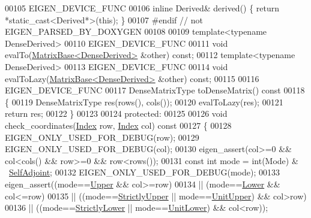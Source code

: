 \begin{DoxyCode}
00105     EIGEN\_DEVICE\_FUNC
00106     \textcolor{keyword}{inline} Derived& derived() \{ \textcolor{keywordflow}{return} *\textcolor{keyword}{static\_cast<}Derived*\textcolor{keyword}{>}(\textcolor{keyword}{this}); \}
00107 \textcolor{preprocessor}{    #endif // not EIGEN\_PARSED\_BY\_DOXYGEN}
00108 
00109     \textcolor{keyword}{template}<\textcolor{keyword}{typename} DenseDerived>
00110     EIGEN\_DEVICE\_FUNC
00111     \textcolor{keywordtype}{void} evalTo(\hyperlink{group___core___module_class_eigen_1_1_matrix_base}{MatrixBase<DenseDerived>} &other) \textcolor{keyword}{const};
00112     \textcolor{keyword}{template}<\textcolor{keyword}{typename} DenseDerived>
00113     EIGEN\_DEVICE\_FUNC
00114     \textcolor{keywordtype}{void} evalToLazy(\hyperlink{group___core___module_class_eigen_1_1_matrix_base}{MatrixBase<DenseDerived>} &other) \textcolor{keyword}{const};
00115 
00116     EIGEN\_DEVICE\_FUNC
00117     DenseMatrixType toDenseMatrix()\textcolor{keyword}{ const}
00118 \textcolor{keyword}{    }\{
00119       DenseMatrixType res(rows(), cols());
00120       evalToLazy(res);
00121       \textcolor{keywordflow}{return} res;
00122     \}
00123 
00124   \textcolor{keyword}{protected}:
00125 
00126     \textcolor{keywordtype}{void} check\_coordinates(\hyperlink{group___core___module_a554f30542cc2316add4b1ea0a492ff02}{Index} row, \hyperlink{group___core___module_a554f30542cc2316add4b1ea0a492ff02}{Index} col)\textcolor{keyword}{ const}
00127 \textcolor{keyword}{    }\{
00128       EIGEN\_ONLY\_USED\_FOR\_DEBUG(row);
00129       EIGEN\_ONLY\_USED\_FOR\_DEBUG(col);
00130       eigen\_assert(col>=0 && col<cols() && row>=0 && row<rows());
00131       \textcolor{keyword}{const} \textcolor{keywordtype}{int} mode = int(Mode) & ~\hyperlink{group__enums_gga39e3366ff5554d731e7dc8bb642f83cda2491fc6765056421f504eb7e16083e8f}{SelfAdjoint};
00132       EIGEN\_ONLY\_USED\_FOR\_DEBUG(mode);
00133       eigen\_assert((mode==\hyperlink{group__enums_gga39e3366ff5554d731e7dc8bb642f83cda6bcb58be3b8b8ec84859ce0c5ac0aaec}{Upper} && col>=row)
00134                 || (mode==\hyperlink{group__enums_gga39e3366ff5554d731e7dc8bb642f83cda891792b8ed394f7607ab16dd716f60e6}{Lower} && col<=row)
00135                 || ((mode==\hyperlink{group__enums_gga39e3366ff5554d731e7dc8bb642f83cdae38aad7d66fecfb213fce453edff4c7a}{StrictlyUpper} || mode==\hyperlink{group__enums_gga39e3366ff5554d731e7dc8bb642f83cda8b0b63ff46dcd7377b59df14e0562fc1}{UnitUpper}) && col>row)
00136                 || ((mode==\hyperlink{group__enums_gga39e3366ff5554d731e7dc8bb642f83cda00aa79c8865ada1584c4d57bcd93299f}{StrictlyLower} || mode==\hyperlink{group__enums_gga39e3366ff5554d731e7dc8bb642f83cda8155cfdfde9e75e7144dff0393d17181}{UnitLower}) && col<row));

\end{DoxyCode}
